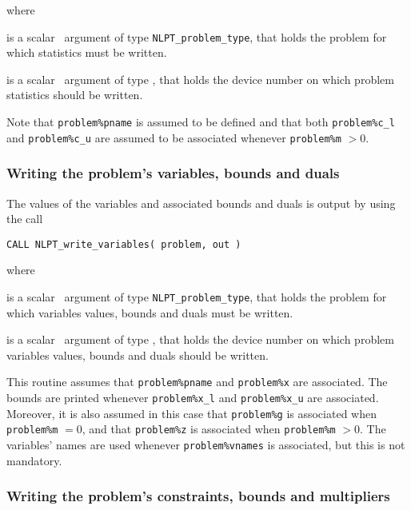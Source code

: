 \documentclass{galahad}
\newcommand{\packagename}{NLPT}
\begin{document}
\noindent where
\begin{description}
 is a scalar \intentin\ argument of type {\tt NLPT\_problem\_type},
that holds the problem for which statistics must be written.

 is a scalar \intentin\ argument of type \integer, that
holds the device number on which problem statistics should be written.
\end{description}

\noindent
Note that {\tt problem\%pname} is assumed to be defined and that both
{\tt problem\%c\_l} and {\tt problem\%c\_u} are assumed to be associated
whenever {\tt problem\%m} $> 0$.

\subsubsection{Writing the problem's variables, bounds and duals}
\label{w_vars}


The values of the variables and associated bounds and duals is output
by using the call
\vspace*{1mm}

\hspace{8mm}
{\tt CALL \packagename\_write\_variables( problem, out )}

\noindent where
\begin{description}
 is a scalar \intentin\ argument of type {\tt NLPT\_problem\_type},
that holds the problem for which variables values, bounds and duals must be
written.

 is a scalar \intentin\ argument of type \integer, that
holds the device number on which problem variables values, bounds and duals
should be written.
\end{description}

\noindent
This routine assumes that {\tt problem\%pname} and {\tt problem\%x} are
associated. The bounds are printed whenever {\tt problem\%x\_l} and 
{\tt problem\%x\_u} are associated. Moreover, it is also
assumed in this case that {\tt problem\%g} is associated when {\tt problem\%m}
$= 0$, and that {\tt problem\%z}  is associated when {\tt problem\%m} $> 0$. 
The variables' names are used whenever {\tt problem\%vnames} is associated, but
this is not mandatory.

\subsubsection{Writing the problem's constraints, bounds and multipliers}
\label{w_cons}
\end{document}
